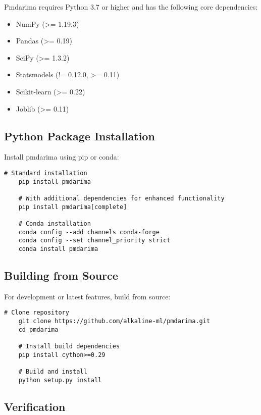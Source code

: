 Pmdarima requires Python 3.7 or higher and has the following core dependencies:
\begin{itemize}
	\item NumPy (>= 1.19.3)
	\item Pandas (>= 0.19)
	\item SciPy (>= 1.3.2)
	\item Statsmodels (!= 0.12.0, >= 0.11)
	\item Scikit-learn (>= 0.22)
	\item Joblib (>= 0.11)
\end{itemize}

\subsection{Python Package Installation}
\label{subsec:python_install}

Install pmdarima using pip or conda:

\begin{lstlisting}[style=bashstyle, caption={Pmdarima Installation}]
	# Standard installation
	pip install pmdarima
	
	# With additional dependencies for enhanced functionality
	pip install pmdarima[complete]
	
	# Conda installation
	conda config --add channels conda-forge
	conda config --set channel_priority strict
	conda install pmdarima
\end{lstlisting}

\subsection{Building from Source}
\label{subsec:source_install}

For development or latest features, build from source:

\begin{lstlisting}[style=bashstyle, caption={Source Installation}]
	# Clone repository
	git clone https://github.com/alkaline-ml/pmdarima.git
	cd pmdarima
	
	# Install build dependencies
	pip install cython>=0.29
	
	# Build and install
	python setup.py install
\end{lstlisting}

\subsection{Verification}
\label{subsec:verification}

